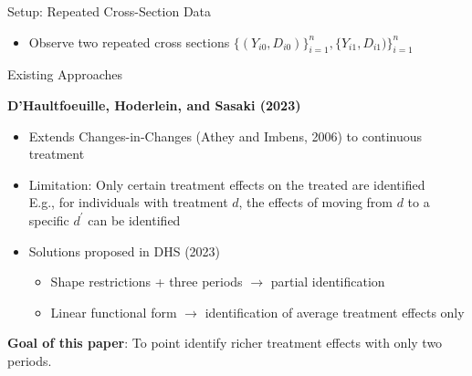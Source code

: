 \documentclass[aspectratio=1610, 9pt]{beamer}
\begin{document}
\begin{frame}{Setup: Repeated Cross-Section Data}

   \begin{itemize}
         \item Observe two repeated cross sections $\{(Y_{i0},D_{i0})\}_{i=1}^n,\{Y_{i1},D_{i1})\}_{i=1}^n$ 
\end{itemize}

\end{frame}


\begin{frame}{Existing Approaches}

\textbf{D’Haultfoeuille, Hoderlein, and Sasaki (2023)}
\vspace{0.3cm}
\begin{itemize}
    \item Extends Changes-in-Changes (Athey and Imbens, 2006) to continuous treatment
   \vspace{0.15cm}
   \item Limitation: Only certain treatment effects on the treated are identified \\
   
   E.g., for individuals with treatment $d$, the effects of moving from $d$ to a specific $d^\prime$ can be identified
   
    \vspace{0.15cm}
    \item Solutions proposed in DHS (2023)
    \begin{itemize}
        \item[(1)] Shape restrictions + three periods $\rightarrow$ partial identification
   \item[(2)] Linear functional form $\rightarrow$  identification of average treatment effects only

    \end{itemize}
\end{itemize}
\vspace{0.3cm}
\pause
   \textbf{Goal of this paper}: To point identify richer treatment effects with only two periods.
\end{frame}





\end{document}
